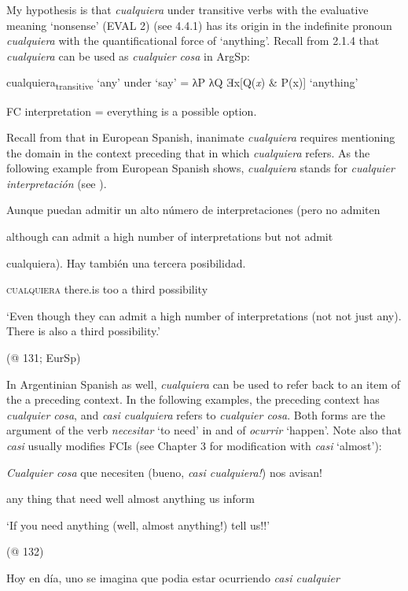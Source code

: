 My hypothesis is that \textit{cualquiera} under transitive verbs with the evaluative meaning ‘nonsense’ (EVAL 2) (see 4.4.1) has its origin in the indefinite pronoun \textit{cualquiera} with the quantificational force of ‘anything’. Recall from 2.1.4 that \textit{cualquiera} can be used as \textit{cualquier cosa} in ArgSp: 

    cualquiera\textsubscript{transitive} ‘any’ under ‘say’ = λP λQ Ǝx[Q(\textit{x}) \& P(x)] ‘anything’ 

FC interpretation = everything is a possible option.

Recall from  that in European Spanish, inanimate \textit{cualquiera} requires mentioning the domain in the context preceding that in which \textit{cualquiera} refers. As the following example from European Spanish shows, \textit{cualquiera} stands for \textit{cualquier interpretación} (see ).

    Aunque  puedan  admitir  un  alto  número  de  interpretaciones  (pero  no  admiten

    although  can  admit  a  high  number  of  interpretations  but  not  admit

    cualquiera).  Hay  también  una  tercera  posibilidad.

    \textsc{cualquiera}  there.is  too  a  third  possibility

    ‘Even though they can admit a high number of interpretations (not not just any). There is also a third possibility.’

    (@ 131; EurSp)

In Argentinian Spanish as well, \textit{cualquiera} can be used to refer back to an item of the a preceding context. In the following examples, the preceding context has \textit{cualquier cosa}, and \textit{casi cualquiera} refers to \textit{cualquier cosa}. Both forms are the argument of the verb \textit{necesitar} ‘to need’ in  and of \textit{ocurrir} ‘happen’. Note also that \textit{casi} usually modifies FCIs (see Chapter 3 for modification with \textit{casi} ‘almost’):

\label{bkm:Ref150786782}    \textit{Cualquier  cosa} que  necesiten  (bueno,  \textit{casi  cualquiera!}) nos  avisan!

    any  thing  that  need  well  almost  anything  us  inform

    ‘If you need anything (well, almost anything!) tell us!!’

    (@ 132)

\label{bkm:Ref150786875}    Hoy  en  día,  uno  se  imagina  que  podia  estar  ocurriendo  \textit{casi  cualquier}

